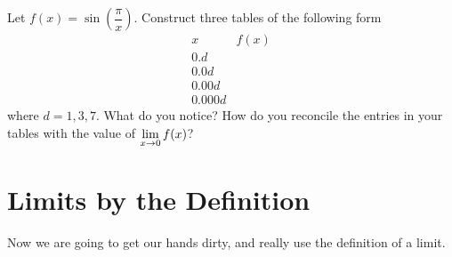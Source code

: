 \begin{exercises}
\begin{exercise} 
Let $f(x) = \sin\left(\dfrac{\pi}{x}\right)$. Construct three tables
of the following form
\[
\begin{array}{c|c}
 x & f(x) \\ \hline
 0.d &   \\
 0.0d &  \\
 0.00d &   \\
 0.000d &  
\end{array}
\]
where $d = 1,3,7$. What do you notice? How do you reconcile the
entries in your tables with the value of $\displaystyle\lim_{x\to 0} f(x)$?
\end{exercise}
\end{exercises}















\section{Limits by the Definition}


Now we are going to get our hands dirty, and really use the definition
of a limit.

